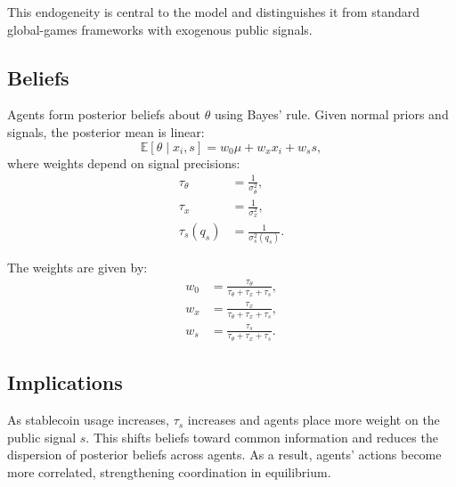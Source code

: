 This endogeneity is central to the model and distinguishes it from standard global-games frameworks with exogenous public signals.

\subsection{Beliefs}

Agents form posterior beliefs about $\theta$ using Bayes' rule. Given normal priors and signals, the posterior mean is linear:
\begin{equation}
\mathbb{E}[\theta \mid x_i, s] = w_0 \mu + w_x x_i + w_s s,
\end{equation}
where weights depend on signal precisions:
\begin{align}
\tau_\theta &= \frac{1}{\sigma_\theta^2}, \\
\tau_x &= \frac{1}{\sigma_x^2}, \\
\tau_s(q_s) &= \frac{1}{\sigma_s^2(q_s)}.
\end{align}

The weights are given by:
\begin{align}
w_0 &= \frac{\tau_\theta}{\tau_\theta + \tau_x + \tau_s}, \\
w_x &= \frac{\tau_x}{\tau_\theta + \tau_x + \tau_s}, \\
w_s &= \frac{\tau_s}{\tau_\theta + \tau_x + \tau_s}.
\end{align}

\subsection{Implications}

As stablecoin usage increases, $\tau_s$ increases and agents place more weight on the public signal $s$. This shifts beliefs toward common information and reduces the dispersion of posterior beliefs across agents. As a result, agents' actions become more correlated, strengthening coordination in equilibrium.
